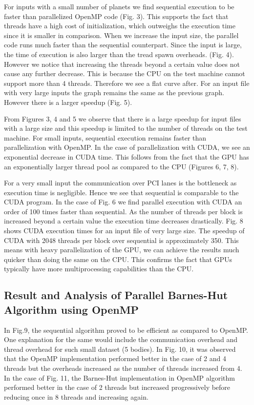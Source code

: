 For inputs with a small number of planets we find sequential execution to be faster than parallelized OpenMP code (Fig. 3). This supports the fact that threads have a high cost of initialization, which outweighs the execution time since it is smaller in comparison. When we increase the input size, the parallel code runs much faster than the sequential counterpart. Since the input is large, the time of execution is also larger than the tread spawn overheads. (Fig. 4). However we notice that increasing the threads beyond a certain value does not cause any further decrease. This is because the CPU on the test machine cannot support more than 4 threads. Therefore we see a flat curve after. For an input file with very large inputs the graph remains the same as the previous graph. However there is a larger speedup (Fig. 5). \par

From Figures 3, 4 and 5 we observe that there is a large speedup for input files with a large size and this speedup is limited to the number of threads on the test machine. For small inputs, sequential execution remains faster than parallelization with OpenMP. In the case of parallelization with CUDA, we see an exponential decrease in CUDA time. This follows from the fact that the GPU has an exponentially larger thread pool as compared to the CPU (Figures 6, 7, 8). \par

For a very small input the communication over PCI lanes is the bottleneck as execution time is negligible. Hence we see that sequential is comparable to the CUDA program. In the case of Fig. 6 we find parallel execution with CUDA an order of 100 times faster than sequential. As the number of threads per block is increased beyond a certain value the execution time decreases drastically. Fig. 8 shows CUDA execution times for an input file of very large size. The speedup of CUDA with 2048 threads per block over sequential is approximately 350. This means with heavy parallelization of the GPU, we can achieve the results much quicker than doing the same on the CPU. This confirms the fact that GPUs typically have more multiprocessing capabilities than the CPU.

\subsection{Result and Analysis of Parallel Barnes-Hut Algorithm using OpenMP}

In Fig.9, the sequential algorithm proved to be efficient as compared to OpenMP. One explanation for the same would include the communication overhead and thread overhead for such small dataset (5 bodies). In Fig. 10, it was observed that the OpenMP implementation performed better in the case of 2 and 4 threads but the overheads increased as the number of threads increased from 4. In the case of Fig. 11, the Barnes-Hut implementation in OpenMP algorithm performed better in the case of 2 threads but increased progressively before reducing once in 8 threads and increasing again. \par

